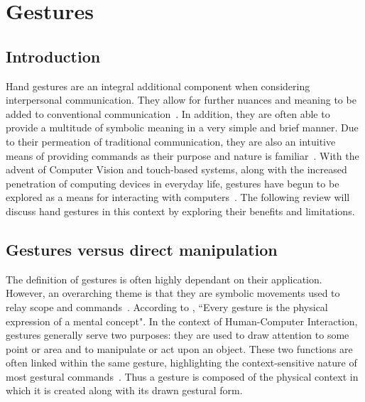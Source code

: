 \section{Gestures}
\subsection{Introduction}
Hand gestures are an integral additional component when considering interpersonal communication. They allow for further nuances and meaning to be added to conventional communication~\citep{Sato01}. In addition, they are often able to provide a multitude of symbolic meaning in a very simple and brief manner. Due to their permeation of traditional communication, they are also an intuitive means of providing commands as their purpose and nature is familiar~\citep{Kett00}. With the advent of Computer Vision and touch-based systems, along with the increased penetration of computing devices in everyday life, gestures have begun to be explored as a means for interacting with computers~\citep{Rubi91}. The following review will discuss hand gestures in this context by exploring their benefits and limitations.

\subsection{Gestures versus direct manipulation}
The definition of gestures is often highly dependant on their application. However, an overarching theme is that they are symbolic movements used to relay scope and commands~\citep{Rubi91}. According to \citet{Huan95}, ``Every gesture is the physical expression of a mental concept". In the context of Human-Computer Interaction, gestures generally serve two purposes: they are used to draw attention to some point or area and to manipulate or act upon an object. These two functions are often linked within the same gesture, highlighting the context-sensitive nature of most gestural commands~\citep{Kett00}. Thus a gesture is composed of the physical context in which it is created along with its drawn gestural form. 

